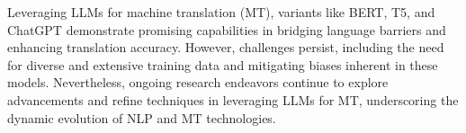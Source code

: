 Leveraging LLMs for machine translation (MT), variants like BERT, T5, and ChatGPT demonstrate promising capabilities in bridging language barriers and enhancing translation accuracy. 
However, challenges persist, including the need for diverse and extensive training data and mitigating biases inherent in these models. 
Nevertheless, ongoing research endeavors continue to explore advancements and refine techniques in leveraging LLMs for MT, underscoring the dynamic evolution of NLP and MT technologies. 